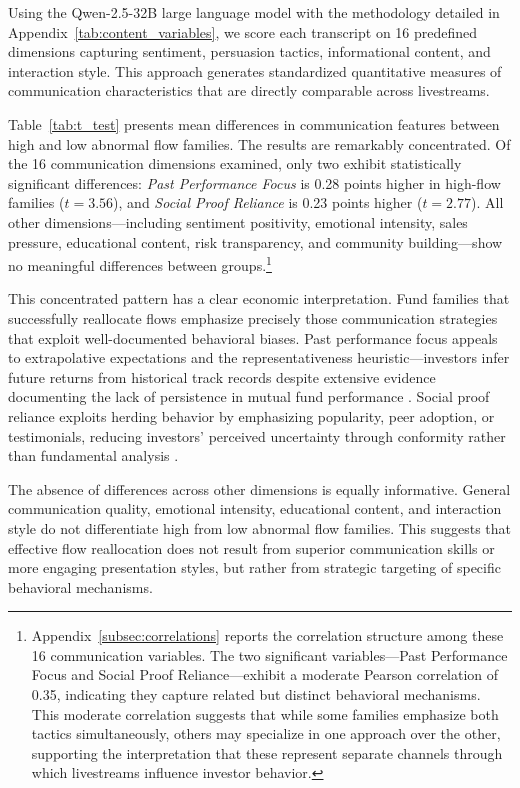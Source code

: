 \documentclass[12pt]{article}
\begin{document}
Using the Qwen-2.5-32B large language model with the methodology detailed in Appendix~\ref{tab:content_variables}, we score each transcript on 16 predefined dimensions capturing sentiment, persuasion tactics, informational content, and interaction style. This approach generates standardized quantitative measures of communication characteristics that are directly comparable across livestreams. %

Table~\ref{tab:t_test} presents mean differences in communication features between high and low abnormal flow families. The results are remarkably concentrated. Of the 16 communication dimensions examined, only two exhibit statistically significant differences: \textit{Past Performance Focus} is 0.28 points higher in high-flow families ($t = 3.56$), and \textit{Social Proof Reliance} is 0.23 points higher ($t = 2.77$). All other dimensions---including sentiment positivity, emotional intensity, sales pressure, educational content, risk transparency, and community building---show no meaningful differences between groups.\footnote{Appendix~\ref{subsec:correlations}  reports the correlation structure among these 16 communication variables. The two significant variables---Past Performance Focus and Social Proof Reliance---exhibit a moderate Pearson correlation of 0.35, indicating they capture related but distinct behavioral mechanisms. This moderate correlation suggests that while some families emphasize both tactics simultaneously, others may specialize in one approach over the other, supporting the interpretation that these represent separate channels through which livestreams influence investor behavior.}

This concentrated pattern has a clear economic interpretation. Fund families that successfully reallocate flows emphasize precisely those communication strategies that exploit well-documented behavioral biases. Past performance focus appeals to extrapolative expectations and the representativeness heuristic—investors infer future returns from historical track records despite extensive evidence documenting the lack of persistence in mutual fund performance \citep{carhart1997persistence}. Social proof reliance exploits herding behavior by emphasizing popularity, peer adoption, or testimonials, reducing investors' perceived uncertainty through conformity rather than fundamental analysis \citep{bikhchandani1992theory}.

The absence of differences across other dimensions is equally informative. General communication quality, emotional intensity, educational content, and interaction style do not differentiate high from low abnormal flow families. This suggests that effective flow reallocation does not result from superior communication skills or more engaging presentation styles, but rather from strategic targeting of specific behavioral mechanisms.
\end{document}
